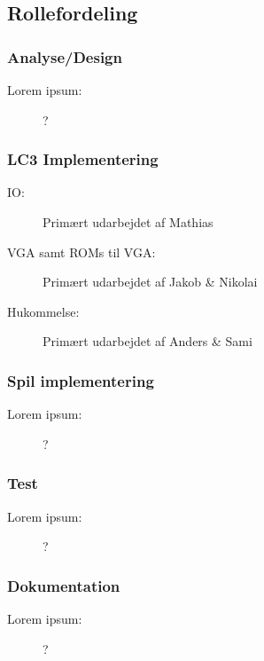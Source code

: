 \subsection*{Rollefordeling}
\subsubsection*{Analyse/Design}
\begin{description}
	\item[Lorem ipsum:] ?
\end{description}

\subsubsection*{LC3 Implementering}
\begin{description}
	\item[IO:] Primært udarbejdet af Mathias
	\item[VGA samt ROMs til VGA:] Primært udarbejdet af Jakob \& Nikolai
	\item[Hukommelse:] Primært udarbejdet af Anders \& Sami
\end{description}

\subsubsection*{Spil implementering}
\begin{description}
	\item[Lorem ipsum:] ?
\end{description}

\subsubsection*{Test}
\begin{description}
	\item[Lorem ipsum:] ?
\end{description}

\subsubsection*{Dokumentation}
\begin{description}
	\item[Lorem ipsum:] ?
\end{description}